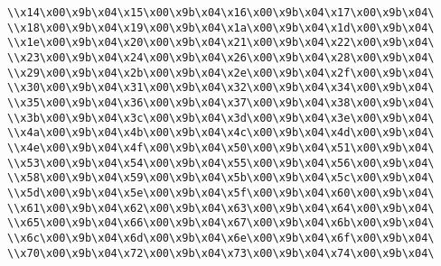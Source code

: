 \verb|\\x14\x00\x9b\x04\x15\x00\x9b\x04\x16\x00\x9b\x04\x17\x00\x9b\x04\|\newline
\verb|\\x18\x00\x9b\x04\x19\x00\x9b\x04\x1a\x00\x9b\x04\x1d\x00\x9b\x04\|\newline
\verb|\\x1e\x00\x9b\x04\x20\x00\x9b\x04\x21\x00\x9b\x04\x22\x00\x9b\x04\|\newline
\verb|\\x23\x00\x9b\x04\x24\x00\x9b\x04\x26\x00\x9b\x04\x28\x00\x9b\x04\|\newline
\verb|\\x29\x00\x9b\x04\x2b\x00\x9b\x04\x2e\x00\x9b\x04\x2f\x00\x9b\x04\|\newline
\verb|\\x30\x00\x9b\x04\x31\x00\x9b\x04\x32\x00\x9b\x04\x34\x00\x9b\x04\|\newline
\verb|\\x35\x00\x9b\x04\x36\x00\x9b\x04\x37\x00\x9b\x04\x38\x00\x9b\x04\|\newline
\verb|\\x3b\x00\x9b\x04\x3c\x00\x9b\x04\x3d\x00\x9b\x04\x3e\x00\x9b\x04\|\newline
\verb|\\x4a\x00\x9b\x04\x4b\x00\x9b\x04\x4c\x00\x9b\x04\x4d\x00\x9b\x04\|\newline
\verb|\\x4e\x00\x9b\x04\x4f\x00\x9b\x04\x50\x00\x9b\x04\x51\x00\x9b\x04\|\newline
\verb|\\x53\x00\x9b\x04\x54\x00\x9b\x04\x55\x00\x9b\x04\x56\x00\x9b\x04\|\newline
\verb|\\x58\x00\x9b\x04\x59\x00\x9b\x04\x5b\x00\x9b\x04\x5c\x00\x9b\x04\|\newline
\verb|\\x5d\x00\x9b\x04\x5e\x00\x9b\x04\x5f\x00\x9b\x04\x60\x00\x9b\x04\|\newline
\verb|\\x61\x00\x9b\x04\x62\x00\x9b\x04\x63\x00\x9b\x04\x64\x00\x9b\x04\|\newline
\verb|\\x65\x00\x9b\x04\x66\x00\x9b\x04\x67\x00\x9b\x04\x6b\x00\x9b\x04\|\newline
\verb|\\x6c\x00\x9b\x04\x6d\x00\x9b\x04\x6e\x00\x9b\x04\x6f\x00\x9b\x04\|\newline
\verb|\\x70\x00\x9b\x04\x72\x00\x9b\x04\x73\x00\x9b\x04\x74\x00\x9b\x04\|\newline
